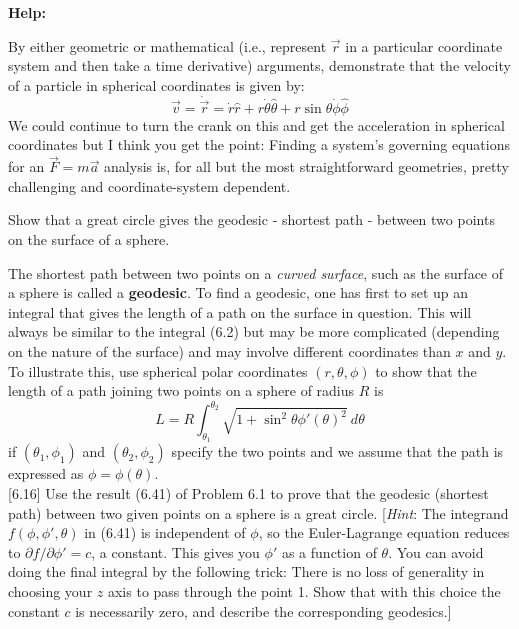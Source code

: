 \documentclass[11pt,letterpaper,boxed]{../hmcpset}
\begin{document}
\textbf{Help:}

\begin{problem}[i]
By either geometric or mathematical (i.e., represent $\vec r$ in a particular coordinate system and then take a time derivative) arguments, demonstrate that the velocity of a particle in spherical coordinates is given by: $$\vec v = \dot{\vec r} = \dot r \hat r + r \dot \theta \hat \theta + r \sin \theta \dot \phi \hat \phi $$
We could continue to turn the crank on this and get the acceleration in spherical coordinates but I think you get the point: Finding a system's governing equations for an $\vec F = m\vec a$ analysis is, for all but the most straightforward geometries, pretty challenging and coordinate-system dependent.
\end{problem}


\vfill
\begin{solution}




\end{solution}

\newpage

\begin{problem}[ii \& iii]
Show that a great circle gives the geodesic - shortest path - between two points on the surface of a sphere.

\begin{problem}[6.1] The shortest path between two points on a \textit{curved surface}, such as the surface of a sphere is called a \textbf{geodesic}. To find a geodesic, one has first to set up an integral that gives the length of a path on the surface in question. This will always be similar to the integral (6.2) but may be more complicated (depending on the nature of the surface) and may involve different coordinates than $x$ and $y$. To illustrate this, use spherical polar coordinates $(r, \theta, \phi)$ to show that the length of a path joining two points on a sphere of radius $R$ is
$$ L = R\int_{\theta_1}^{\theta_2} \sqrt{1 + \sin^2 \theta \phi' (\theta)^2} \ d \theta $$
if $(\theta_1,\phi_1)$ and $(\theta_2, \phi_2)$ specify the two points and we assume that the path is expressed as $\phi = \phi(\theta)$.\\

[6.16] Use the result (6.41) of Problem 6.1 to prove that the geodesic (shortest path) between two given points on a sphere is a great circle. [\textit{Hint}: The integrand $f(\phi, \phi',\theta)$ in (6.41) is independent of $\phi$, so the Euler-Lagrange equation reduces to $\partial f/\partial \phi' = c$, a constant. This gives you $\phi'$ as a function of $\theta$. You can avoid doing the final integral by the following trick: There is no loss of generality in choosing your $z$ axis to pass through the point 1. Show that with this choice the constant $c$ is necessarily zero, and describe the corresponding geodesics.]

\end{problem}
\end{problem}
\begin{solution}


\vfill
\end{solution}
\end{document}

